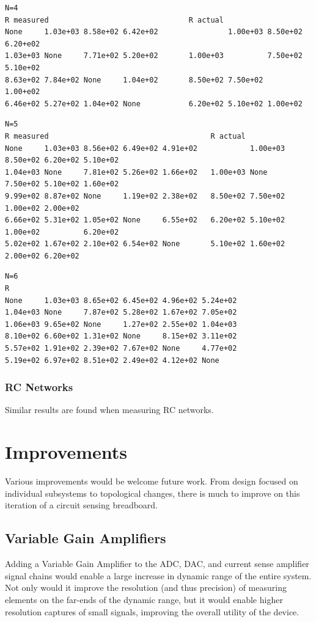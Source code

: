 \documentclass[11pt,twoside]{mitthesis}
\begin{document}
\begin{Verbatim}[fontsize=\footnotesize]
N=4
R measured                                R actual
None     1.03e+03 8.58e+02 6.42e+02                1.00e+03 8.50e+02 6.20+e02
1.03e+03 None     7.71e+02 5.20e+02       1.00e+03          7.50e+02 5.10e+02
8.63e+02 7.84e+02 None     1.04e+02       8.50e+02 7.50e+02          1.00+e02
6.46e+02 5.27e+02 1.04e+02 None           6.20e+02 5.10e+02 1.00e+02     
\end{Verbatim}

\newpage 

\begin{Verbatim}[fontsize=\footnotesize]
N=5
R measured                                     R actual
None     1.03e+03 8.56e+02 6.49e+02 4.91e+02            1.00e+03 8.50e+02 6.20e+02 5.10e+02
1.04e+03 None     7.81e+02 5.26e+02 1.66e+02   1.00e+03 None     7.50e+02 5.10e+02 1.60e+02
9.99e+02 8.87e+02 None     1.19e+02 2.38e+02   8.50e+02 7.50e+02          1.00e+02 2.00e+02
6.66e+02 5.31e+02 1.05e+02 None     6.55e+02   6.20e+02 5.10e+02 1.00e+02          6.20e+02
5.02e+02 1.67e+02 2.10e+02 6.54e+02 None       5.10e+02 1.60e+02 2.00e+02 6.20e+02 
\end{Verbatim}

\begin{Verbatim}[fontsize=\footnotesize]
N=6
R
None     1.03e+03 8.65e+02 6.45e+02 4.96e+02 5.24e+02  
1.04e+03 None     7.87e+02 5.28e+02 1.67e+02 7.05e+02  
1.06e+03 9.65e+02 None     1.27e+02 2.55e+02 1.04e+03  
8.10e+02 6.60e+02 1.31e+02 None     8.15e+02 3.11e+02  
5.57e+02 1.91e+02 2.39e+02 7.67e+02 None     4.77e+02  
5.19e+02 6.97e+02 8.51e+02 2.49e+02 4.12e+02 None     
\end{Verbatim}

\subsubsection{RC Networks}
Similar results are found when measuring RC networks.

\section{Improvements}
Various improvements would be welcome future work.
From design focused on individual subsystems to topological changes, there is much to improve on this iteration of a circuit sensing breadboard.
\subsection{Variable Gain Amplifiers}
Adding a Variable Gain Amplifier to the ADC, DAC, and current sense amplifier signal chains would enable a large increase in dynamic range of the entire system.
Not only would it improve the resolution (and thus precision) of measuring elements on the far-ends of the dynamic range, but it would enable higher resolution captures of small signals, improving the overall utility of the device.
\end{document}
